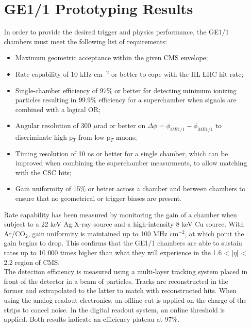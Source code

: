   \section{GE1/1 Prototyping Results}

    In order to provide the desired trigger and physics performance, the GE1/1 chambers must meet the following list of requirements:
    \begin{itemize}
      \item Maximum geometric acceptance within the given CMS envelope;
      \item Rate capability of 10 kHz cm$^{-2}$ or better to cope with the HL-LHC hit rate;
      \item Single-chamber efficiency of 97\% or better for detecting minimum ionizing particles resulting in 99.9\% efficiency for a superchamber when signals are combined with a logical OR;
      \item Angular resolution of 300 $\mu$rad or better on $ \Delta \phi = \phi_{GE1/1} - \phi_{ME1/1} $ to discriminate high-p$_T$ from low-p$_T$ muons;
      \item Timing resolution of 10 ns or better for a single chamber, which can be improved when combining the superchamber measurments, to allow matching with the CSC hits;
      \item Gain uniformity of 15\% or better across a chamber and between chambers to ensure that no geometrical or trigger biases are present. \\
    \end{itemize}

    Rate capability has been measured by monitoring the gain of a chamber when subject to a 22 keV Ag X-ray source and a high-intensity 8 keV Cu source. With Ar/CO$_2$, gain uniformity is maintained up to 100 MHz cm$^{-2}$, at which point the gain begins to drop. This confirms that the GE1/1 chambers are able to sustain rates up to 10 000 times higher than what they will experience in the 1.6 < |$\eta$| < 2.2 region of CMS. \\

    The detection efficiency is measured using a multi-layer tracking system placed in front of the detector in a beam of particles. Tracks are reconstructed in the former and extrapolated to the latter to match with reconstructed hits. When using the analog readout electronics, an offline cut is applied on the charge of the strips to cancel noise. In the digital readout system, an online threshold is applied. Both results indicate an efficiency plateau at 97\%. \\

